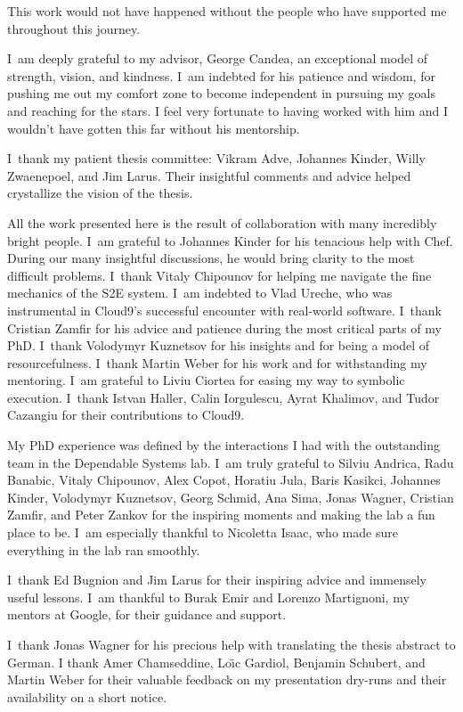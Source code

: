This work would not have happened without the people who have supported me throughout this journey.


I~am deeply grateful to my advisor, George Candea, an exceptional model of strength, vision, and kindness.
%
I~am indebted for his patience and wisdom, for pushing me out my comfort zone to become independent in pursuing my goals and reaching for the stars.  I feel very fortunate to having worked with him and I wouldn't have gotten this far without his mentorship.


I~thank my patient thesis committee: Vikram Adve, Johannes Kinder, Willy Zwaenepoel, and Jim Larus.  Their insightful comments and advice helped crystallize the vision of the thesis.


All the work presented here is the result of collaboration with many incredibly bright people.
%
I~am grateful to Johannes Kinder for his tenacious help with Chef.  During our many insightful discussions, he would bring clarity to the most difficult problems.
%
I~thank Vitaly Chipounov for helping me navigate the fine mechanics of the S2E system.
%
I~am indebted to Vlad Ureche, who was instrumental in Cloud9's successful encounter with real-world software.
%
I~thank Cristian Zamfir for his advice and patience during the most critical parts of my PhD.
%
I~thank Volodymyr Kuznetsov for his insights and for being a model of resourcefulness.
%
I~thank Martin Weber for his work and for withstanding my mentoring. 
%
I~am grateful to Liviu Ciortea for easing my way to symbolic execution.
%
I~thank Istvan Haller, Calin Iorgulescu, Ayrat Khalimov, and Tudor Cazangiu for their contributions to Cloud9.


My PhD experience was defined by the interactions I had with the outstanding team in the Dependable Systems lab.
%
I~am truly grateful to
Silviu Andrica,
Radu Banabic,
Vitaly Chipounov,
Alex Copot,
Horatiu Jula,
Baris Kasikci,
Johannes Kinder,
Volodymyr Kuznetsov,
Georg Schmid,
Ana Sima,
Jonas Wagner,
Cristian Zamfir,
and
Peter Zankov
for the inspiring moments and making the lab a fun place to be.
%
I~am especially thankful to Nicoletta Isaac, who made sure everything in the lab ran smoothly.


I~thank Ed Bugnion and Jim Larus for their inspiring advice and immensely useful lessons.
%
I~am thankful to Burak Emir and Lorenzo Martignoni, my mentors at Google, for their guidance and support.


I~thank Jonas Wagner for his precious help with translating the thesis abstract to German.
%
I thank Amer Chamseddine, Lo\"{\i}c Gardiol, Benjamin Schubert, and Martin Weber for their valuable feedback on my presentation dry-runs and their availability on a short notice.



